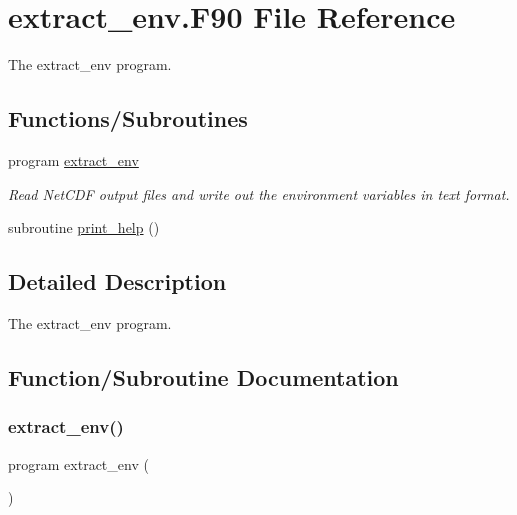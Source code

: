 \hypertarget{extract__env_8_f90}{}\section{extract\+\_\+env.\+F90 File Reference}
\label{extract__env_8_f90}


The extract\+\_\+env program.  


\subsection*{Functions/\+Subroutines}
\begin{DoxyCompactItemize}
\item 
program \mbox{\hyperlink{extract__env_8_f90_a6f2efa7564b41963703fde51d38017cd}{extract\+\_\+env}}
\begin{DoxyCompactList}\small\item\em Read Net\+C\+DF output files and write out the environment variables in text format. \end{DoxyCompactList}\item 
subroutine \mbox{\hyperlink{extract__env_8_f90_aa8cac5bded68ccda19a12136abe75f4d}{print\+\_\+help}} ()
\end{DoxyCompactItemize}


\subsection{Detailed Description}
The extract\+\_\+env program. 



\subsection{Function/\+Subroutine Documentation}
\mbox{\label{extract__env_8_f90_a6f2efa7564b41963703fde51d38017cd}} 
\subsubsection{\texorpdfstring{extract\+\_\+env()}{extract\_env()}}
{\footnotesize\ttfamily program extract\+\_\+env (\begin{DoxyParamCaption}{ }\end{DoxyParamCaption})}



